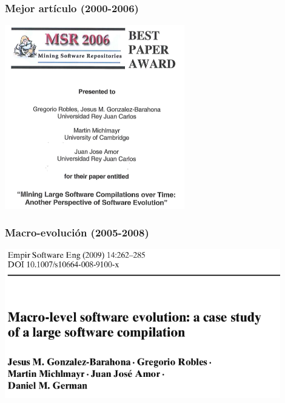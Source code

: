 \begin{frame}[fragile]
  \frametitle{Mejor artículo (2000-2006)}

  \begin{center}
  \includegraphics[height=8cm]{figs/msr-best-paper}
  \end{center}  
  
\end{frame}

\begin{frame}[fragile]
  \frametitle{Macro-evolución (2005-2008)}

  \begin{center}
  \includegraphics[width=12cm]{figs/macro-evolution}
  \end{center}  
  
\end{frame}

